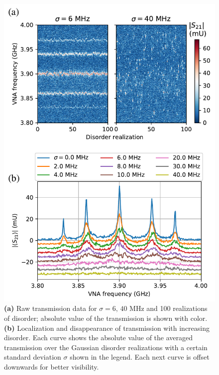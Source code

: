 \documentclass[%
 aps, pra,
 amsmath,amssymb,
 reprint,%
superscriptaddress
]{revtex4-2}
\begin{document}
\begin{figure}
	\includegraphics[width=1\linewidth]{Pictures/mbl}
	\caption{\textbf{(a)} Raw transmission data for $\sigma = 6,\, 40$ MHz and 100 realizations of disorder; absolute value of the transmission is shown with color. \textbf{(b)} Localization and disappearance of transmission with increasing disorder. Each curve shows the absolute value of the averaged transmission over the Gaussian disorder realizations with a certain standard deviation $\sigma$ shown in the legend. Each next curve is offset downwards for better visibility.}
	\label{fig:mbl}
\end{figure}
\end{document}
